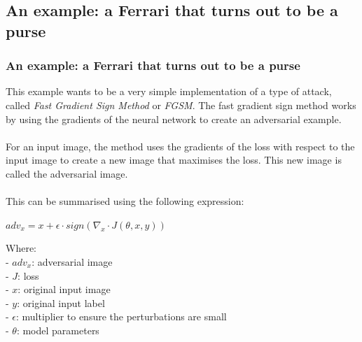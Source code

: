\documentclass[8pt]{beamer}
\begin{document}
\subsection{An example: a Ferrari that turns out to be a purse}
\begin{frame}
\frametitle{An example: a Ferrari that turns out to be a purse}
This example wants to be a very simple implementation of a type of attack, called \textit{Fast Gradient Sign Method} or \textit{FGSM}. The fast gradient sign method works by using the gradients of the neural network to create an adversarial example.
\\~\\
For an input image, the method uses the gradients of the loss with respect to the input image to create a new image that maximises the loss. This new image is called the adversarial image.
\\~\\
This can be summarised using the following expression:\\
\vspace{0.1cm}
\begin{center}
$
adv_x=x+\epsilon \cdot sign(\nabla_x \cdot J(\theta, x, y))
$
\end{center}
Where:\\
\quad - $adv_x$: adversarial image\\
\quad - $J$: loss\\
\quad - $x$: original input image\\
\quad - $y$: original input label\\
\quad - $\epsilon$: multiplier to ensure the perturbations are small\\
\quad - $\theta$: model parameters
\end{frame}
\end{document}
